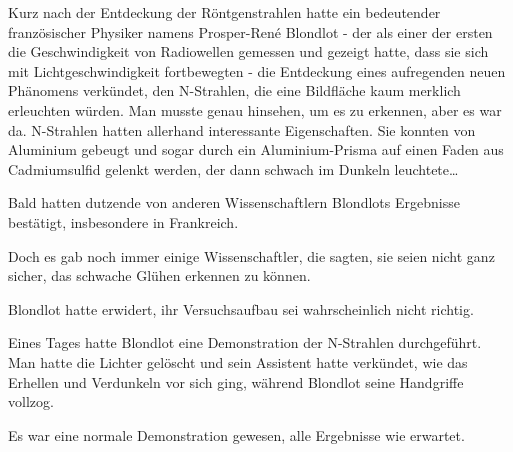 Kurz nach der Entdeckung der Röntgenstrahlen hatte ein bedeutender französischer Physiker namens Prosper-René Blondlot - der als einer der ersten die Geschwindigkeit von Radiowellen gemessen und gezeigt hatte, dass sie sich mit Lichtgeschwindigkeit fortbewegten - die Entdeckung eines aufregenden neuen Phänomens verkündet, den N-Strahlen, die eine Bildfläche kaum merklich erleuchten würden. Man musste genau hinsehen, um es zu erkennen, aber es war da. N-Strahlen hatten allerhand interessante Eigenschaften. Sie konnten von Aluminium gebeugt und sogar durch ein Aluminium-Prisma auf einen Faden aus Cadmiumsulfid gelenkt werden, der dann schwach im Dunkeln leuchtete…

Bald hatten dutzende von anderen Wissenschaftlern Blondlots Ergebnisse bestätigt, insbesondere in Frankreich.

Doch es gab noch immer einige Wissenschaftler, die sagten, sie seien nicht ganz sicher, das schwache Glühen erkennen zu können.

Blondlot hatte erwidert, ihr Versuchsaufbau sei wahrscheinlich nicht richtig.

Eines Tages hatte Blondlot eine Demonstration der N-Strahlen durchgeführt. Man hatte die Lichter gelöscht und sein Assistent hatte verkündet, wie das Erhellen und Verdunkeln vor sich ging, während Blondlot seine Handgriffe vollzog.

Es war eine normale Demonstration gewesen, alle Ergebnisse wie erwartet.

